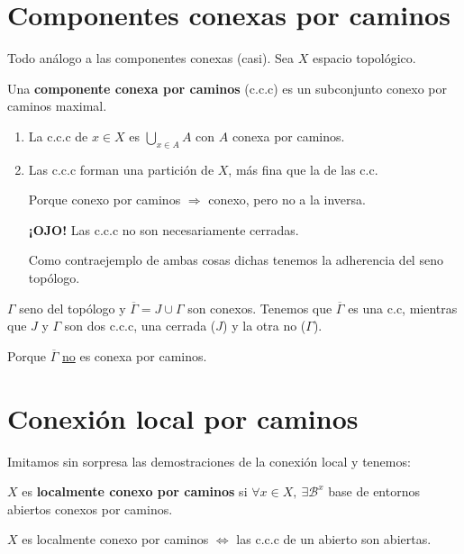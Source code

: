 \section{Componentes conexas por caminos}%
\label{sec:componentes_conexas_por_caminos}
Todo análogo a las componentes conexas (casi). Sea $X$ espacio topológico.
\begin{defi}
Una \textbf{componente conexa por caminos} (c.c.c) es un subconjunto conexo por caminos maximal.
\end{defi}
\begin{prop}[Descripción]
\begin{enumerate}
    \item La c.c.c de $x \in X$ es $\bigcup_{x \in A} A$ con $A$ conexa por caminos.
    \item Las c.c.c forman una partición de $X$, más fina que la de las c.c.
    \begin{demo}
        Porque conexo por caminos $\Rightarrow$ conexo, pero no a la inversa.

        \textbf{¡OJO!} Las c.c.c no son necesariamente cerradas. 

        Como contraejemplo de ambas cosas dichas tenemos la adherencia del seno topólogo. 
    \end{demo}
\end{enumerate} 
\end{prop}

\begin{ej}
    $\Gamma$ seno del topólogo y $\overline{\Gamma} = J \cup \Gamma$ son conexos. Tenemos que $\overline{\Gamma}$ es una c.c, mientras que $J$ y $\Gamma$ son dos c.c.c, una cerrada ($J$) y la otra no ($\Gamma$). 
    \begin{demo}
    Porque $\overline{\Gamma}$ \underline{no} es conexa por caminos.
    \end{demo}
\end{ej}

\section{Conexión local por caminos}%
\label{sec:conexion_local_por_caminos}
Imitamos sin sorpresa las demostraciones de la conexión local y tenemos:
\begin{defi}
$X$ es \textbf{localmente conexo por caminos} si $\forall x \in X,\ \exists \mathcal{B}^x$ base de entornos abiertos conexos por caminos.
\end{defi}
\begin{prop}
$X$ es localmente conexo por caminos $\Leftrightarrow$ las c.c.c de un abierto son abiertas.
\end{prop}

